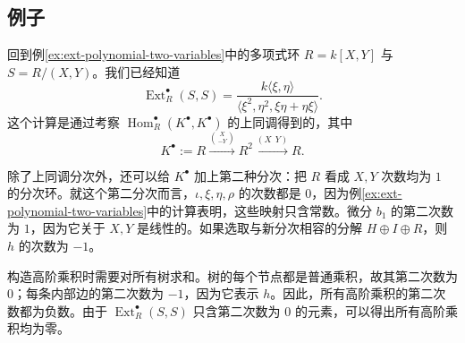 \subsection{例子}\label{subsec:minimal-model-examples}
\begin{example}\label{ex:minimal-model-polynomial}
回到例\ref{ex:ext-polynomial-two-variables}中的多项式环 $R=k[X,Y]$ 与 $S=R/(X,Y)$。我们已经知道
\[
  \operatorname{Ext}_R^\bullet(S,S)
  =\frac{k\langle\xi,\eta\rangle}
  {\langle\xi^2,\eta^2,\xi\eta+\eta\xi\rangle}.
\]
这个计算是通过考察 $\operatorname{Hom}_R^\bullet(K^\bullet,K^\bullet)$ 的上同调得到的，其中
\[
  K^\bullet:=R\xrightarrow{\binom{X}{-Y}}R^2
  \xrightarrow{(X\ \ Y)}R.
\]

除了上同调分次外，还可以给 $K^\bullet$ 加上第二种分次：把 $R$ 看成 $X,Y$ 次数均为 $1$ 的分次环。就这个第二分次而言，$\iota,\xi,\eta,\rho$ 的次数都是 $0$，因为例\ref{ex:ext-polynomial-two-variables}中的计算表明，这些映射只含常数。微分 $b_1$ 的第二次数为 $1$，因为它关于 $X,Y$ 是线性的。如果选取与新分次相容的分解 $H\oplus I\oplus R$，则 $h$ 的次数为 $-1$。

构造高阶乘积时需要对所有树求和。树的每个节点都是普通乘积，故其第二次数为 $0$；每条内部边的第二次数为 $-1$，因为它表示 $h$。因此，所有高阶乘积的第二次数都为负数。由于 $\operatorname{Ext}_R^\bullet(S,S)$ 只含第二次数为 $0$ 的元素，可以得出所有高阶乘积均为零。
\end{example}

